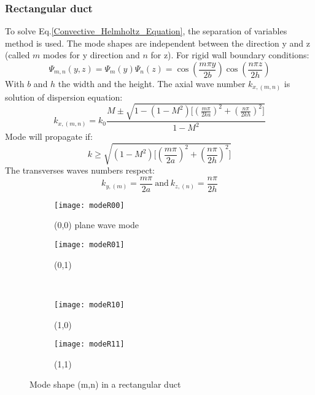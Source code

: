\subsubsection{Rectangular duct} \label{sec:RectDuct}
To solve Eq.\eqref{Convective_Helmholtz_Equation}, the separation of variables method is used. The mode shapes are independent between the direction y and z (called $m$ modes for y direction and $n$ for z). For rigid wall boundary conditions:
\begin{equation} 
    \Psi_{m,n}(y,z)=\Psi_{m}(y)\Psi_{n}(z)=\cos(\frac{m\pi y}{2b})\cos(\frac{n\pi z}{2h})
\end{equation}
With $b$ and $h$ the width and the height.
The axial wave number $k_{x,(m,n)}$ is solution of dispersion equation: 
\begin{equation} 
    k_{x,(m,n)}=k_0\frac{M\pm\sqrt{1-(1-M^2)\Big[(\frac{m\pi}{2ka})^2+(\frac{n\pi}{2kh})^2\Big]}}{1-M^2}
\end{equation}
Mode will propagate if:
\begin{equation} 
    k\geq\sqrt{(1-M^2)\Big[(\frac{m\pi}{2a})^2+(\frac{n\pi}{2h})^2\Big]}
\end{equation}
The transverses waves numbers respect: 
\begin{equation} 
    k_{y,(m)}=\frac{m\pi}{2a} \ \text{and} \ k_{z,(n)}=\frac{n\pi}{2h}
\end{equation}
\begin{figure}[H] \centering
    \begin{subfigure}{.5\textwidth}\centering
     \texttt{[image: modeR00]}
     \caption{(0,0) plane wave mode}
    \end{subfigure}%
    \begin{subfigure}{.5\textwidth}\centering
     \texttt{[image: modeR01]}
     \caption{(0,1)}
    \end{subfigure}\\
    \begin{subfigure}{.5\textwidth}\centering
     \texttt{[image: modeR10]}
     \caption{(1,0)}
    \end{subfigure}%
    \begin{subfigure}{.5\textwidth}\centering
     \texttt{[image: modeR11]}
     \caption{(1,1)}
    \end{subfigure}
    \caption{Mode shape (m,n) in a rectangular duct}
\end{figure}
